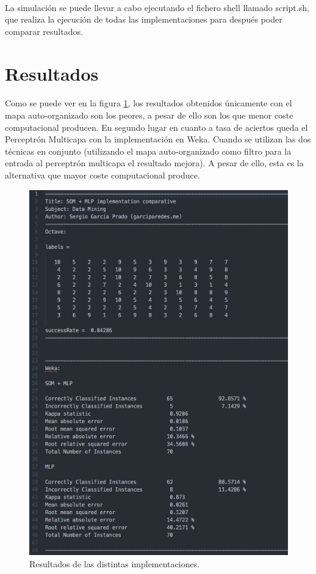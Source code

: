 \documentclass[10pt, a4paper,spanish]{article}
\begin{document}
			\paragraph{}
			La simulación se puede llevar a cabo ejecutando el fichero shell llamado script.sh, que realiza la ejecución de todas las implementaciones para después poder comparar resultados.

	\section{Resultados}

		\paragraph{}
		Como se puede ver en la figura \ref{fig:results}, los resultados obtenidos únicamente con el mapa auto-organizado son los peores, a pesar de ello son los que menor coste computacional producen. En segundo lugar en cuanto a tasa de aciertos queda el Perceptrón Multicapa con la implementación en Weka. Cuando se utilizan las dos técnicas en conjunto (utilizando el mapa auto-organizado como filtro para la entrada al perceptrón multicapa el resultado mejora). A pesar de ello, esta es la alternativa que mayor coste computacional produce.

		\begin{figure}[htb]
			\centering
			\includegraphics[width=\textwidth]{results}
			\caption{Resultados de las distintas implementaciones.}
            \label{fig:results}
		\end{figure}
\end{document}
